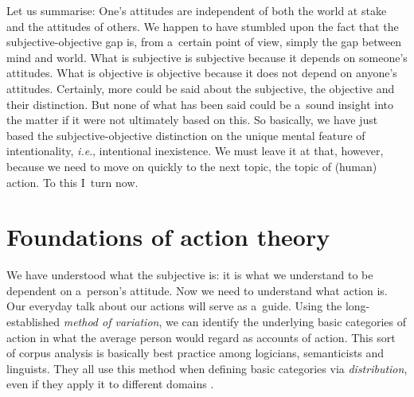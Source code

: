 Let us summarise: One's attitudes are independent of both the world at stake and the attitudes of others. We happen to have stumbled upon the fact that the subjective-objective gap is, from a~certain point of view, simply the gap between mind and world. What is subjective is subjective because it depends on someone's attitudes. What is objective is objective because it does not depend on anyone's attitudes. Certainly, more could be said about the subjective, the objective and their distinction. But none of what has been said could be a~sound insight into the matter if it were not ultimately based on this. So basically, we have just based the subjective-objective distinction on the unique mental feature of intentionality, \textit{i.e}., intentional inexistence. We must leave it at that, however, because we need to move on quickly to the next topic, the topic of (human) action. To this I~turn now.



\section{Foundations of action theory}


We have understood what the subjective is: it is what we understand to be dependent on a~person's attitude. Now we need to understand what action is. Our everyday talk about our actions will serve as a~guide. Using the long-established \textit{method of variation}, we can identify the underlying basic categories of action in what the average person would regard as accounts of action. This sort of corpus analysis is basically best practice among logicians, semanticists and linguists. They all use this method when defining basic categories via \textit{distribution}, even if they apply it to different domains 
\parencites[see, e.g.,][p.46]{burton-roberts_analysing_2016}[][p.34]{tallerman_understanding_2015}[][p.20ff]{lewis_general_1970}[][p.147]{lyons_introduction_1968}[][p.3]{ajdukiewicz_syntaktische_1935}[][p.242]{husserl_prolegomena_1913}[all anticipated by][]{frege_function_1891}[p.189,][]{}[and][]{}.%




